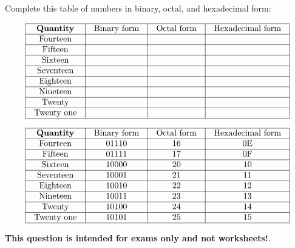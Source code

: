 

Complete this table of numbers in binary, octal, and hexadecimal form:


$$\vbox{\offinterlineskip
\halign{\strut
\vrule \quad\hfil # \ \hfil & 
\vrule \quad\hfil # \ \hfil & 
\vrule \quad\hfil # \ \hfil & 
\vrule \quad\hfil # \ \hfil \vrule \cr
\noalign{\hrule}
%
{\bf Quantity} & Binary form & Octal form & Hexadecimal form \cr
%
\noalign{\hrule}
%
Fourteen &  &  &  \cr
%
\noalign{\hrule}
%
Fifteen &  &  &  \cr
%
\noalign{\hrule}
%
Sixteen &  &  &  \cr
%
\noalign{\hrule}
%
Seventeen &  &  &  \cr
%
\noalign{\hrule}
%
Eighteen &  &  &  \cr
%
\noalign{\hrule}
%
Nineteen &  &  &  \cr
%
\noalign{\hrule}
%
Twenty &  &  &  \cr
%
\noalign{\hrule}
%
Twenty one &  &  &  \cr
%
\noalign{\hrule}
} %
}$$ %








$$\vbox{\offinterlineskip
\halign{\strut
\vrule \quad\hfil # \ \hfil & 
\vrule \quad\hfil # \ \hfil & 
\vrule \quad\hfil # \ \hfil & 
\vrule \quad\hfil # \ \hfil \vrule \cr
\noalign{\hrule}
%
{\bf Quantity} & Binary form & Octal form & Hexadecimal form \cr
%
\noalign{\hrule}
%
Fourteen & 01110 & 16 & 0E \cr
%
\noalign{\hrule}
%
Fifteen & 01111 & 17 & 0F \cr
%
\noalign{\hrule}
%
Sixteen & 10000 & 20 & 10 \cr
%
\noalign{\hrule}
%
Seventeen & 10001 & 21 & 11 \cr
%
\noalign{\hrule}
%
Eighteen & 10010 & 22 & 12 \cr
%
\noalign{\hrule}
%
Nineteen & 10011 & 23 & 13 \cr
%
\noalign{\hrule}
%
Twenty & 10100 & 24 & 14 \cr
%
\noalign{\hrule}
%
Twenty one & 10101 & 25 & 15 \cr
%
\noalign{\hrule}
} %
}$$ %







{\bf This question is intended for exams only and not worksheets!}.




